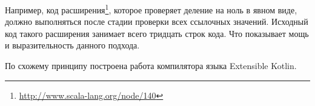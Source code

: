 Например, код расширения\footnote{\url{http://www.scala-lang.org/node/140}}, которое проверяет деление на ноль в явном виде, должно выполняться после стадии проверки всех ссылочных значений. Исходный код такого расширения занимает всего тридцать строк кода. Что показывает мощь и выразительность данного подхода.

По схожему принципу построена работа компилятора языка Extensible Kotlin.